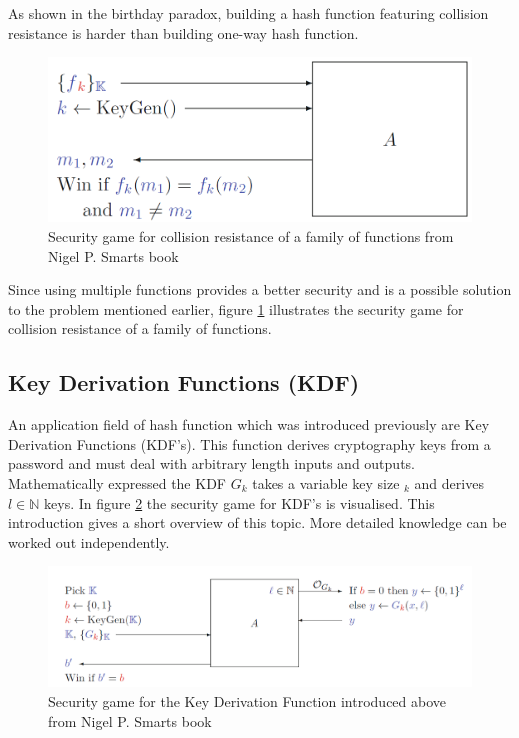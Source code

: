 \documentclass[a4paper,11pt, twoside]{article}
\begin{document}
As shown in the birthday paradox, building a hash function featuring collision resistance is harder than building one-way hash function. 
\begin{figure}[H]
	\centering
	\includegraphics[scale=0.34]{figures/SecGame_CollisionResistance.png}
	\caption{Security game for collision resistance of a family of functions from Nigel P. Smarts book}
	\label{fig:secgame_collisionresistance}
\end{figure}
Since using multiple functions provides a better security and is a possible solution to the problem mentioned earlier, figure \ref{fig:secgame_collisionresistance} illustrates the security game for collision resistance of a family of functions.


\subsection{Key Derivation Functions (KDF)}
An application field of hash function which was introduced previously are Key Derivation Functions (KDF's). This function derives cryptography keys from a password and must deal with arbitrary length inputs and outputs. \cite{key_derivation_function}\newline
Mathematically expressed the KDF $G_k$ takes a variable key size $_k$ and derives $l \in \mathbb N$ keys. In figure \ref{fig:secgame_kfd} the security game for KDF's is visualised. This introduction gives a short overview of this topic. More detailed knowledge can be worked out independently. 
\begin{figure}[H]
	\centering
	\includegraphics[scale=0.5]{figures/SecGame_KDF.png}
	\caption{Security game for the Key Derivation Function introduced above from Nigel P. Smarts book}
	\label{fig:secgame_kfd}
\end{figure}
\end{document}
